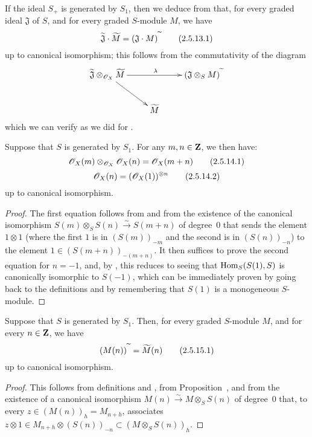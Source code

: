 If the ideal $S_+$ is generated by $S_1$, then we deduce from  that, for every graded ideal $\mathfrak{J}$ of $S$, and for every graded $S$-module $M$, we have
\[
\label{II.2.5.13.1}
  \widetilde{\mathfrak{J}}\cdot\widetilde{M} = (\mathfrak{J}\cdot M)^{\,\widetilde{\,}\,}
\tag{2.5.13.1}
\]
up to canonical isomorphism;
this follows from the commutativity of the diagram
\[
  \xymatrix{
    \widetilde{\mathfrak{J}}\otimes_{\sh{O}_X}\widetilde{M} \ar[rr]^\lambda \ar[dr]
    && (\mathfrak{J}\otimes_S M)^\supertilde
  \\&\widetilde{M}
  }
\]
which we can verify as we did for .

\begin{corollary}[2.5.14]
\label{II.2.5.14}
Suppose that $S$ is generated by $S_1$.
For any $m,n\in\mathbf{Z}$, we then have:
\[
\label{II.2.5.14.1}
  \mathscr{O}_X(m)\otimes_{\mathscr{O}_X}\mathscr{O}_X(n) = \mathscr{O}_X(m+n)
\tag{2.5.14.1}
\]
\[
\label{II.2.5.14.2}
  \mathscr{O}_X(n) = (\mathscr{O}_X(1))^{\otimes n}
\tag{2.5.14.2}
\]
up to canonical isomorphism.
\end{corollary}

\begin{proof}
The first equation follows from  and from the existence of the canonical isomorphism $S(m)\otimes_S S(n)\xrightarrow{\sim}S(m+n)$ of degree~$0$ that sends the element $1\otimes1$ (where the first $1$ is in $(S(m))_{-m}$ and the second is in $(S(n))_{-n}$) to the element $1\in(S(m+n))_{-(m+n)}$.
It then suffices to prove the second equation for $n=-1$, and, by , this reduces to seeing that $\operatorname{Hom}_S(S(1),S)$ is canonically isomorphic to $S(-1)$, which can be immediately proven by going back to the definitions  and by remembering that $S(1)$ is a monogeneous $S$-module.
\end{proof}

\begin{corollary}[2.5.15]
\label{II.2.5.15}
Suppose that $S$ is generated by $S_1$.
Then, for every graded $S$-module $M$, and for every $n\in\mathbf{Z}$, we have
\[
\label{II.2.5.15.1}
  (M(n))^{\,\widetilde{\,}\,} = \widetilde{M}(n)
\tag{2.5.15.1}
\]
up to canonical isomorphism.
\end{corollary}

\begin{proof}
This follows from definitions  and , from Proposition~, and from the existence of a canonical isomorphism $M(n)\xrightarrow{\sim}M\otimes_S S(n)$ of degree~$0$ that, to every $z\in(M(n))_h=M_{n+h}$, associates $z\otimes1\in M_{n+h}\otimes(S(n))_{-n}\subset(M\otimes_S S(n))_h$.
\end{proof}

